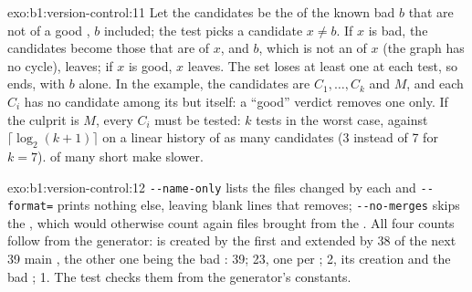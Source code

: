\begin{solution}{exo:b1:version-control:11}
Let the candidates be the  of the known bad  $b$ that are not  of a good , $b$ included;
the test picks a candidate $x \neq b$. If $x$ is bad, the candidates become those that are  of $x$, and $b$,
which is not an  of $x$ (the graph has no cycle), leaves; if $x$ is good, $x$ leaves. The set loses at least one
 at each test, so  ends, with $b$ alone. In the example, the candidates are $C_1, \dots, C_k$ and $M$, and
each $C_i$ has no candidate among its  but itself: a ``good'' verdict removes one  only. If the culprit
is $M$, every $C_i$ must be tested: $k$ tests in the worst case, against $\lceil \log_2 (k + 1) \rceil$ on a linear history
of as many candidates (3 instead of 7 for $k = 7$).  of many short  make  slower.
\end{solution}

\begin{solution}{exo:b1:version-control:12}
\texttt{-{}-{}name-{}only} lists the files changed by each  and \texttt{-{}-{}format=} prints nothing else, leaving blank lines
that  removes; \texttt{-{}-{}no-{}merges} skips the , which would otherwise count again files brought from the
. All four counts follow from the generator:  is created by the first  and extended by 38 of
the next 39 main , the other one being the bad : 39;  23, one per  ;
 2, its creation and the bad ;  1. The test  checks
them from the generator's constants.
\end{solution}

